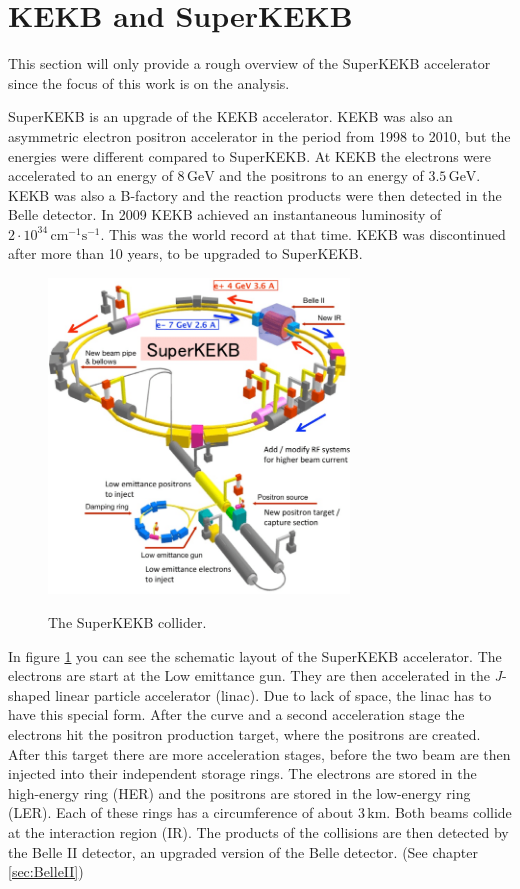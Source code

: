 \documentclass[a4paper,11pt,oneside,final,german,openbib,pdftex]{scrbook}
\begin{document}
\section{KEKB and SuperKEKB}
\label{sec:KEK}
This section will only provide a rough overview of the SuperKEKB accelerator since the focus of this work is on the analysis. 

SuperKEKB is an upgrade of the KEKB accelerator. KEKB was also an asymmetric electron positron accelerator in the period from 1998 to 2010, but the energies were different compared to SuperKEKB. At KEKB the electrons were accelerated to an energy of $8\,\textrm{GeV}$ and the positrons to an energy of $3.5\,\textrm{GeV}$. KEKB was also a B-factory and the reaction products were then detected in the Belle detector. In 2009 KEKB achieved an instantaneous luminosity of $2 \cdot 10^{34}\,\textrm{cm}^{-1}\textrm{s}^{-1}$. This was the world record at that time. KEKB was discontinued after more than 10 years, to be upgraded to SuperKEKB.


\begin{figure}[h!]
\begin{center}
	\includegraphics[width=8cm]{Bilder/SuperKEKB.png}
	\label{fig:SuperKEKB}
	\caption{The SuperKEKB collider.}
\end{center}
\end{figure}

In figure \ref{fig:SuperKEKB} you can see the schematic layout of the SuperKEKB accelerator. The electrons are start at the Low emittance gun. They are then accelerated in the \textit{J}-shaped linear particle accelerator (linac). Due to lack of space, the linac has to have this special form. After the curve and a second acceleration stage the electrons hit the positron production target, where the positrons are created. After this target there are more acceleration stages, before the two beam are then injected into their independent storage rings. The electrons are stored in the high-energy ring (HER) and the positrons are stored in the low-energy ring (LER). Each of these rings has a circumference of about $3\,\textrm{km}$. Both beams collide at the interaction region (IR). The products of the collisions are then detected by the Belle II detector, an upgraded version of the Belle detector. (See chapter \ref{sec:BelleII})
\end{document}
